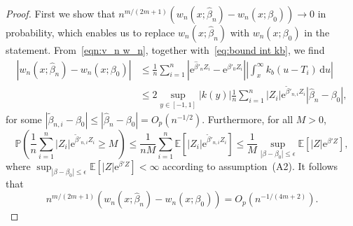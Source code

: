\documentclass[11pt,reqno]{amsart}
\theoremstyle{definition}
\theoremstyle{plain}
\theoremstyle{remark}
\begin{document}
\begin{proof}
First we show that $n^{m/(2m+1)}(w_n(x;\hat{\beta}_n)-w_n(x;\beta_0))\to 0$ in probability,
which enables us to replace $w_n(x;\hat{\beta}_n)$ with $w_n(x;\beta_0)$ in the statement.
From~\eqref{eqn:v_n w_n}, together with~\eqref{eq:bound int kb}, we find
\[
\begin{split}
\left|w_n(x;\hat{\beta}_n)-w_n(x;\beta_0)\right|
&\leq
\frac1n
\sum_{i=1}^n \left|\mathrm{e}^{\hat{\beta}'_nZ_i}-\mathrm{e}^{\beta'_0Z_i}\right|
\left|
\int_x^{\infty}k_b(u-T_i)\,\mathrm{d}u
\right|\\
&\leq
2\sup_{y\in[-1,1]}|k(y)|
\frac1n
\sum_{i=1}^n
|Z_i|\mathrm{e}^{\tilde{\beta}'_{n,i}Z_i}\left|\hat{\beta}_n-\beta_0\right|,
\end{split}
\]
for some $|\tilde{\beta}_{n,i}-\beta_0|\leq|\hat{\beta}_n-\beta_0|=O_p(n^{-1/2})$.
Furthermore, for all $M>0$,
\[
{\mathbb{P}}\left(
\frac{1}{n}\sum_{i=1}^n
|Z_i|\mathrm{e}^{\tilde{\beta}'_{n,i}Z_i}\geq M
\right)
\leq
\frac{1}{nM}\sum_{i=1}^n
{\mathbb{E}}
\left[|Z_i|\mathrm{e}^{\tilde{\beta}'_{n,i}Z_i} \right]
\leq
\frac{1}{M}\sup_{|\beta-\beta_0|\leq \epsilon}{\mathbb{E}}\left[|Z|\mathrm{e}^{\beta'Z} \right],
\]
where $\sup_{|\beta-\beta_0|\leq \epsilon}{\mathbb{E}}[|Z|\mathrm{e}^{\beta'Z}]<\infty$ according to assumption~(A2).
It follows that
\[
n^{m/(2m+1)}
\left(
w_n(x;\hat{\beta}_n)-w_n(x;\beta_0)
\right)
=
O_p(n^{-1/(4m+2)}).
\]


\end{proof}
\end{document}
